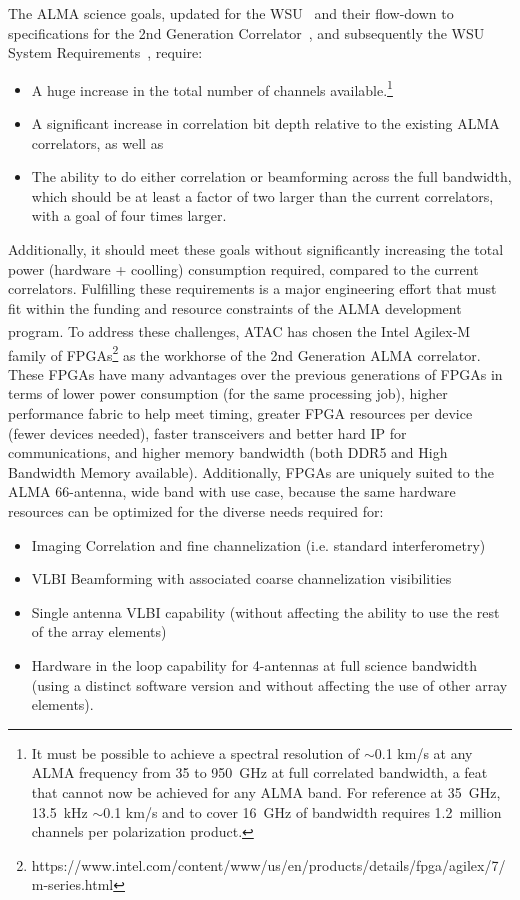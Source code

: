 The ALMA science goals, updated for the WSU~\cite{road_map} and their flow-down to specifications for the 2nd Generation Correlator~\cite{2ndgen}, and subsequently the WSU System Requirements~\cite{sys_reqs}, require:
\begin{itemize}[itemsep=-0.5em]
    \item A huge increase in the total number of channels available.\footnote{It must be possible to achieve a spectral resolution of $\sim$0.1 km/s at any ALMA frequency from 35 to 950~GHz at full correlated bandwidth, a feat that cannot now be achieved for any ALMA band. For reference at 35~GHz, 13.5~kHz $\sim$0.1 km/s and to cover 16~GHz of bandwidth requires 1.2~million channels per polarization product.}
    \item A significant increase in correlation bit depth relative to the existing ALMA correlators, as well as
    \item The ability to do either correlation or beamforming across the full bandwidth, which should be at least a factor of two larger than the current correlators, with a goal of four times larger.
\end{itemize}
Additionally, it should meet these goals without significantly increasing the total power (hardware + coolling) consumption required, compared to the current correlators. Fulfilling these requirements is a major engineering effort that must fit within the funding and resource constraints of the ALMA development program. 
To address these challenges, ATAC has chosen the Intel Agilex-M\,\textsuperscript{\textregistered} family of FPGAs\footnote{https://www.intel.com/content/www/us/en/products/details/fpga/agilex/7/m-series.html} as the workhorse of the 2nd Generation ALMA correlator. These FPGAs have many advantages over the previous generations of FPGAs in terms of lower power consumption (for the same processing job), higher performance fabric to help meet timing, greater FPGA resources per device (fewer devices needed), faster transceivers and better hard IP for communications, and higher memory bandwidth (both DDR5 and High Bandwidth Memory available). Additionally, FPGAs are uniquely suited to the ALMA 66-antenna, wide band with use case, because the same hardware resources can be optimized for the diverse needs required for:
\begin{itemize}[itemsep=-0.5em]
\item Imaging Correlation and fine channelization (i.e. standard interferometry)
\item VLBI Beamforming with associated coarse channelization visibilities
\item Single antenna VLBI capability (without affecting the ability to use the rest of the array elements)
\item Hardware in the loop capability for 4-antennas at full science bandwidth (using a distinct software version and without affecting the use of other array elements).
\end{itemize}

